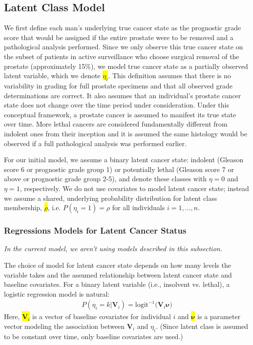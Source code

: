 \documentclass[12pt, letterpaper]{article}
\newcommand{\bmnu}{\boldsymbol{\nu}}
\newcommand{\bmV}{\mathbf{V}}
\newcommand{\beas}{\begin{eqnarray*}}
\newcommand{\eeas}{\end{eqnarray*}}
\newcommand{\highlight}[1]{\colorbox{yellow}{#1}}
\begin{document}
\subsection{Latent Class Model}
We first define each man's underlying true cancer state as the prognostic grade score that would be assigned if the entire prostate were to be removed and a pathological analysis performed. Since we only observe this true cancer state on the subset of patients in active surveillance who choose surgical removal of the prostate (approximately 15$\%$), we model true cancer state as a partially observed latent variable, which we denote \highlight{$\eta_i$}. This definition assumes that there is no variability in grading for full prostate specimens and that all observed grade determinations are correct. It also assumes that an individual's prostate cancer state does not change over the time period under consideration. Under this conceptual framework, a prostate cancer is assumed to manifest its true state over time. More lethal cancers are considered fundamentally different from indolent ones from their inception and it is assumed the same histology would be observed if a full pathological analysis was performed earlier.  

For our initial model, we assume a binary latent cancer state: indolent (Gleason score 6 or prognostic grade group 1) or potentially lethal (Gleason score 7 or above or prognostic grade group 2-5), and denote these classes with $\eta=0$ and $\eta=1$, respectively. We do not use covariates to model latent cancer state; instead we assume a shared, underlying probability distribution for latent class membership, \highlight{$\rho$}, i.e. $P(\eta_i=1) = \rho$ for all individuals $i=1,\dots,n.$ 

\subsubsection{Regressions Models for Latent Cancer Status}
\textit{In the current model, we aren't using models described in this subsection.}

The choice of model for latent cancer state depends on how many levels the variable takes and the assumed relationship between latent cancer state and baseline covariates. For a binary latent variable (i.e., insolvent vs. lethal), a logistic regression model is natural:
\beas
P(\eta_i=k | \bmV_i) = \text{logit}^{-1}\big(\bmV_i \bmnu\big) 
\eeas
Here, \highlight{$\bmV_i$} is a vector of baseline covariates for individual $i$ and \highlight{$\bmnu$} is a parameter vector modeling the association between $\bmV_i$ and $\eta_i$. (Since latent class is assumed to be constant over time, only baseline covariates are used.)
\end{document}
